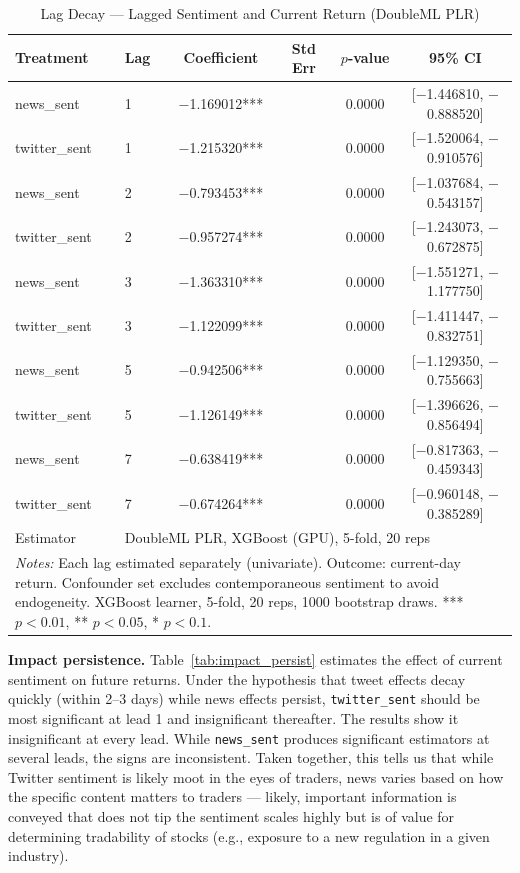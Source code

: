\documentclass[12pt]{article}
\begin{document}
\begin{table}[htbp]
\centering
\caption{Lag Decay --- Lagged Sentiment and Current Return (DoubleML PLR)}
\label{tab:lag_decay}
\begin{tabular}{llcccc}
\hline\hline
Treatment & Lag & Coefficient & Std Err & $p$-value & 95\% CI \\
\hline
news\_sent    & 1 & $-$1.169012*** & & 0.0000 & [$-$1.446810, $-$0.888520] \\
twitter\_sent & 1 & $-$1.215320*** & & 0.0000 & [$-$1.520064, $-$0.910576] \\
news\_sent    & 2 & $-$0.793453*** & & 0.0000 & [$-$1.037684, $-$0.543157] \\
twitter\_sent & 2 & $-$0.957274*** & & 0.0000 & [$-$1.243073, $-$0.672875] \\
news\_sent    & 3 & $-$1.363310*** & & 0.0000 & [$-$1.551271, $-$1.177750] \\
twitter\_sent & 3 & $-$1.122099*** & & 0.0000 & [$-$1.411447, $-$0.832751] \\
news\_sent    & 5 & $-$0.942506*** & & 0.0000 & [$-$1.129350, $-$0.755663] \\
twitter\_sent & 5 & $-$1.126149*** & & 0.0000 & [$-$1.396626, $-$0.856494] \\
news\_sent    & 7 & $-$0.638419*** & & 0.0000 & [$-$0.817363, $-$0.459343] \\
twitter\_sent & 7 & $-$0.674264*** & & 0.0000 & [$-$0.960148, $-$0.385289] \\
\hline
Estimator & \multicolumn{5}{l}{DoubleML PLR, XGBoost (GPU), 5-fold, 20 reps} \\
\hline\hline
\multicolumn{6}{p{0.95\linewidth}}{\footnotesize \textit{Notes:} Each lag estimated separately (univariate). Outcome: current-day return. Confounder set excludes contemporaneous sentiment to avoid endogeneity. XGBoost learner, 5-fold, 20 reps, 1000 bootstrap draws. *** $p<0.01$, ** $p<0.05$, * $p<0.1$.}
\end{tabular}
\end{table}

\textbf{Impact persistence.} Table~\ref{tab:impact_persist} estimates the effect of current sentiment on future returns. Under the hypothesis that tweet effects decay quickly (within 2--3 days) while news effects persist, \texttt{twitter\_sent} should be most significant at lead 1 and insignificant thereafter. The results show it insignificant at every lead. While \texttt{news\_sent} produces significant estimators at several leads, the signs are inconsistent. Taken together, this tells us that while Twitter sentiment is likely moot in the eyes of traders, news varies based on how the specific content matters to traders --- likely, important information is conveyed that does not tip the sentiment scales highly but is of value for determining tradability of stocks (e.g., exposure to a new regulation in a given industry).
\end{document}
